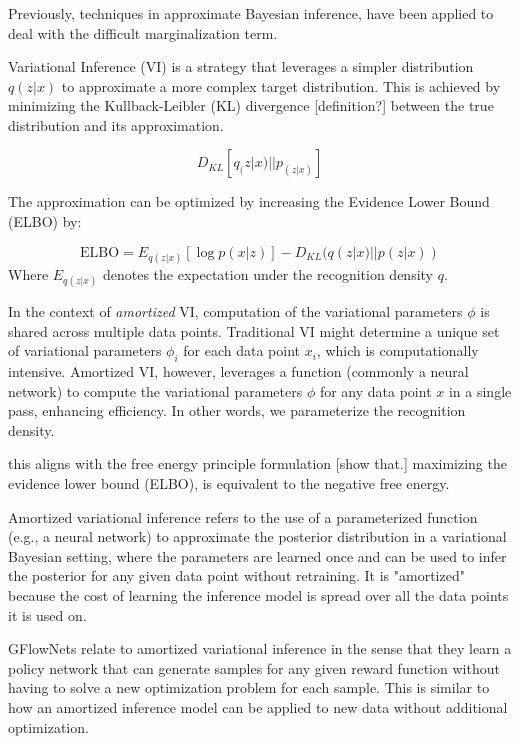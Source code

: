 \subsubsection{}

Previously, techniques in approximate Bayesian inference, have been applied to deal with the difficult marginalization term.

Variational Inference (VI) is a strategy that leverages a simpler distribution \( q(z | x) \)  to approximate a more complex target distribution. This is achieved by minimizing the Kullback-Leibler (KL) divergence [definition?] between the true distribution and its approximation.

\[
    D_{KL}[q_(z|x) || p_(z|x)]
\]

The approximation can be optimized by increasing the Evidence Lower Bound (ELBO) by:

\begin{equation}
\text{ELBO} = E_{q(z|x)}[\log p(x|z)] - D_{KL}(q(z|x) || p(z|x))
\end{equation}
Where \( E_{q(z|x)} \) denotes the expectation under the recognition density \( q \).

In the context of \emph{amortized} VI, computation of the variational parameters \( \phi \) is shared across multiple data points. Traditional VI might determine a unique set of variational parameters \( \phi_i \) for each data point \( x_i \), which is computationally intensive. Amortized VI, however, leverages a function (commonly a neural network) to compute the variational parameters \( \phi \) for any data point \( x \) in a single pass, enhancing efficiency. In other words, we parameterize the recognition density. 

this aligns with the free energy principle formulation [show that.]
maximizing the evidence lower bound (ELBO), is equivalent to the negative free energy. 


Amortized variational inference refers to the use of a parameterized function (e.g., a neural network) to approximate the posterior distribution in a variational Bayesian setting, where the parameters are learned once and can be used to infer the posterior for any given data point without retraining. It is "amortized" because the cost of learning the inference model is spread over all the data points it is used on.

GFlowNets relate to amortized variational inference in the sense that they learn a policy network that can generate samples for any given reward function without having to solve a new optimization problem for each sample. This is similar to how an amortized inference model can be applied to new data without additional optimization.

